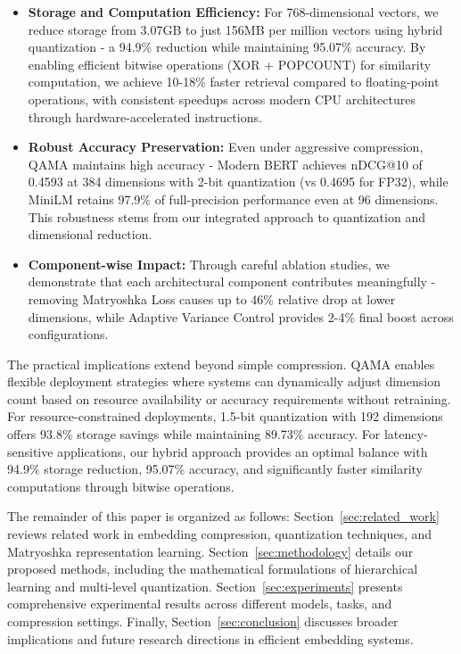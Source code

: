 \begin{itemize}
    \item \textbf{Storage and Computation Efficiency:} For 768-dimensional vectors, we reduce storage from 3.07GB to just 156MB per million vectors using hybrid quantization - a 94.9\% reduction while maintaining 95.07\% accuracy. By enabling efficient bitwise operations (XOR + POPCOUNT) for similarity computation, we achieve 10-18\% faster retrieval compared to floating-point operations, with consistent speedups across modern CPU architectures through hardware-accelerated instructions.
    
    \item \textbf{Robust Accuracy Preservation:} Even under aggressive compression, QAMA maintains high accuracy - Modern BERT achieves nDCG@10 of 0.4593 at 384 dimensions with 2-bit quantization (vs 0.4695 for FP32), while MiniLM retains 97.9\% of full-precision performance even at 96 dimensions. This robustness stems from our integrated approach to quantization and dimensional reduction.
    
    \item \textbf{Component-wise Impact:} Through careful ablation studies, we demonstrate that each architectural component contributes meaningfully - removing Matryoshka Loss causes up to 46\% relative drop at lower dimensions, while Adaptive Variance Control provides 2-4\% final boost across configurations.
\end{itemize}

The practical implications extend beyond simple compression. QAMA enables flexible deployment strategies where systems can dynamically adjust dimension count based on resource availability or accuracy requirements without retraining. For resource-constrained deployments, 1.5-bit quantization with 192 dimensions offers 93.8\% storage savings while maintaining 89.73\% accuracy. For latency-sensitive applications, our hybrid approach provides an optimal balance with 94.9\% storage reduction, 95.07\% accuracy, and significantly faster similarity computations through bitwise operations.

The remainder of this paper is organized as follows: Section~\ref{sec:related_work} reviews related work in embedding compression, quantization techniques, and Matryoshka representation learning. Section~\ref{sec:methodology} details our proposed methods, including the mathematical formulations of hierarchical learning and multi-level quantization. Section~\ref{sec:experiments} presents comprehensive experimental results across different models, tasks, and compression settings. Finally, Section~\ref{sec:conclusion} discusses broader implications and future research directions in efficient embedding systems.



